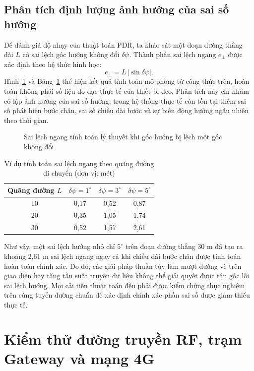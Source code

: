 \subsection{Phân tích định lượng ảnh hưởng của sai số hướng}
Để đánh giá độ nhạy của thuật toán PDR, ta khảo sát một đoạn đường thẳng dài $L$ có sai lệch góc hướng không đổi $\delta\psi$. Thành phần sai lệch ngang $e_\perp$ được xác định theo hệ thức hình học:
\begin{equation}
e_{\perp}=L\,|\sin\delta\psi|.
\end{equation}
Hình~\ref{fig:drift} và Bảng~\ref{tab:drift} thể hiện kết quả tính toán mô phỏng từ công thức trên, hoàn toàn không phải số liệu đo đạc thực tế của thiết bị đeo. Phân tích này chỉ nhằm cô lập ảnh hưởng của sai số hướng; trong hệ thống thực tế còn tồn tại thêm sai số phát hiện bước chân, sai số chiều dài bước và sự biến động hướng ngẫu nhiên theo thời gian.

\begin{figure}[htbp]\centering
\caption{Sai lệch ngang tính toán lý thuyết khi góc hướng bị lệch một góc không đổi}
\label{fig:drift}\end{figure}

\begingroup\SmallTable
\begin{table}[htbp]\centering
\caption{Ví dụ tính toán sai lệch ngang theo quãng đường di chuyển (đơn vị: mét)}\label{tab:drift}
\begin{tabular}{|c|c|c|c|}\hline
Quãng đường $L$ & $\delta\psi = 1^\circ$ & $\delta\psi = 3^\circ$ & $\delta\psi = 5^\circ$ \\\hline
10 & 0,17 & 0,52 & 0,87 \\\hline
20 & 0,35 & 1,05 & 1,74 \\\hline
30 & 0,52 & 1,57 & 2,61 \\\hline
\end{tabular}\end{table}\endgroup

Như vậy, một sai lệch hướng nhỏ chỉ $5^\circ$ trên đoạn đường thẳng 30 m đã tạo ra khoảng 2,61 m sai lệch ngang ngay cả khi chiều dài bước chân được tính toán hoàn toàn chính xác. Do đó, các giải pháp thuần túy làm mượt đường vẽ trên giao diện hay tăng tần suất truyền dữ liệu không thể giải quyết được tận gốc lỗi sai lệch hướng. Mọi cải tiến thuật toán đều phải được kiểm chứng thực nghiệm trên cùng tuyến đường chuẩn để xác định chính xác phần sai số được giảm thiểu thực tế.

\section{Kiểm thử đường truyền RF, trạm Gateway và mạng 4G}\label{sec:testgateway}
